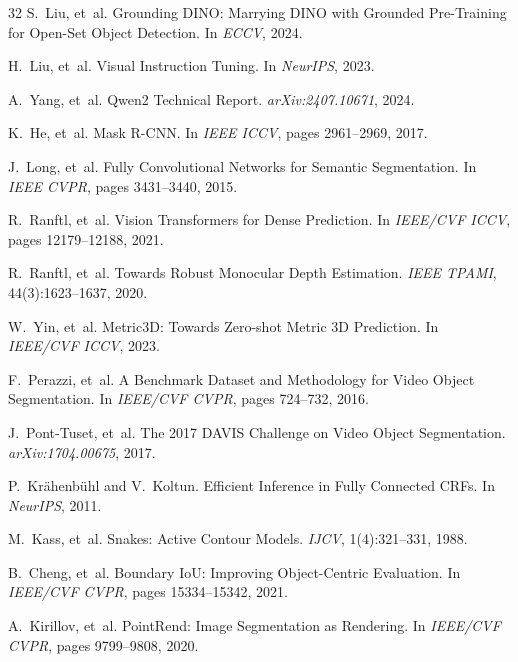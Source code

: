 \documentclass[10pt,twocolumn,letterpaper]{article}
\begin{document}
\begin{thebibliography}{32}
S.~Liu, et~al.
\newblock Grounding DINO: Marrying DINO with Grounded Pre-Training for Open-Set Object Detection.
\newblock In \emph{ECCV}, 2024.

H.~Liu, et~al.
\newblock Visual Instruction Tuning.
\newblock In \emph{NeurIPS}, 2023.

A.~Yang, et~al.
\newblock Qwen2 Technical Report.
\newblock \emph{arXiv:2407.10671}, 2024.

K.~He, et~al.
\newblock Mask R-CNN.
\newblock In \emph{IEEE ICCV}, pages 2961--2969, 2017.

J.~Long, et~al.
\newblock Fully Convolutional Networks for Semantic Segmentation.
\newblock In \emph{IEEE CVPR}, pages 3431--3440, 2015.

R.~Ranftl, et~al.
\newblock Vision Transformers for Dense Prediction.
\newblock In \emph{IEEE/CVF ICCV}, pages 12179--12188, 2021.

R.~Ranftl, et~al.
\newblock Towards Robust Monocular Depth Estimation.
\newblock \emph{IEEE TPAMI}, 44(3):1623--1637, 2020.

W.~Yin, et~al.
\newblock Metric3D: Towards Zero-shot Metric 3D Prediction.
\newblock In \emph{IEEE/CVF ICCV}, 2023.

F.~Perazzi, et~al.
\newblock A Benchmark Dataset and Methodology for Video Object Segmentation.
\newblock In \emph{IEEE/CVF CVPR}, pages 724--732, 2016.

J.~Pont-Tuset, et~al.
\newblock The 2017 DAVIS Challenge on Video Object Segmentation.
\newblock \emph{arXiv:1704.00675}, 2017.

P.~Kr{\"a}henb{\"u}hl and V.~Koltun.
\newblock Efficient Inference in Fully Connected CRFs.
\newblock In \emph{NeurIPS}, 2011.

M.~Kass, et~al.
\newblock Snakes: Active Contour Models.
\newblock \emph{IJCV}, 1(4):321--331, 1988.

B.~Cheng, et~al.
\newblock Boundary IoU: Improving Object-Centric Evaluation.
\newblock In \emph{IEEE/CVF CVPR}, pages 15334--15342, 2021.

A.~Kirillov, et~al.
\newblock PointRend: Image Segmentation as Rendering.
\newblock In \emph{IEEE/CVF CVPR}, pages 9799--9808, 2020.


\end{thebibliography}
\end{document}
